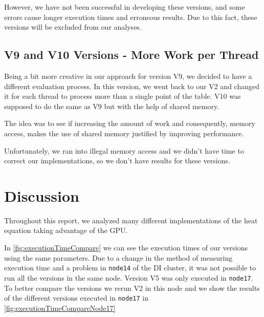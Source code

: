 \documentclass[conference]{IEEEtran}
\begin{document}
However, we have not been successful in developing these versions, and some errors cause longer execution times and erroneous results. Due to this fact, these versions will be excluded from our analyses.


\subsection{V9 and V10 Versions - More Work per Thread}
Being a bit more creative in our approach for version V9, we decided to have a different evaluation process. In this version, we went back to our V2 and changed it for each thread to process more than a single point of the table. V10 was supposed to do the same as V9 but with the help of shared memory.

The idea was to see if increasing the amount of work and consequently, memory access, makes the use of shared memory justified by improving performance.

Unfortunately, we ran into illegal memory access and we didn't have time to correct our implementations, so we don't have results for these versions.



\section{Discussion}

Throughout this report, we analyzed many different implementations of the heat equation taking advantage of the GPU.

In \autoref{fig:executionTimeCompare} we can see the execution times of our versions using the same parameters.
Due to a change in the method of measuring execution time and a problem in \texttt{node14} of the DI cluster, it was not possible to run all the versions in the same node. Version V5 was only executed in \texttt{node17}. To better compare the versions we rerun V2 in this node and we show the results of the different versions executed in \texttt{node17} in \autoref{fig:executionTimeCompareNode17}
\end{document}
